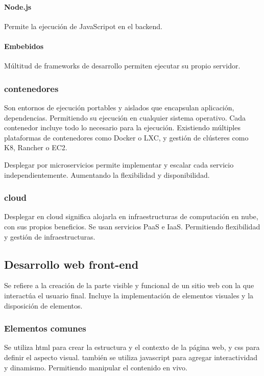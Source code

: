         \paragraph{Node.js}
            Permite la ejecución de JavaScripot en el backend.

        \paragraph{Embebidos}
            Múltitud de frameworks de desarrollo permiten ejecutar su propio servidor.

    \subsubsection{contenedores}
        Son entornos de ejecución portables y aislados que encapsulan aplicación, dependencias. Permitiendo su ejecución en cualquier sistema operativo. Cada contenedor incluye todo lo necesario para la ejecución. Existiendo múltiples plataformas de contenedores como Docker o LXC, y gestión de clústeres como K8, Rancher o EC2.

        Desplegar por microservicios permite implementar y escalar cada servicio independientemente. Aumentando la flexibilidad y disponibilidad.

    \subsubsection{cloud}
        Desplegar en cloud significa alojarla en infraestructuras de computación en nube, con sus propios beneficios. Se usan servicios PaaS e IaaS. Permitiendo flexibilidad y gestión de infraestructuras.

\subsection{Desarrollo web front-end}

    Se refiere a la creación de la parte visible y funcional de un sitio web con la que interactúa el usuario final. Incluye la implementación de elementos visuales y la disposición de elementos.

    \subsubsection{Elementos comunes}
        Se utiliza html para crear la estructura y el contexto de la página web, y css para definir el aspecto visual. también se utiliza javascript para agregar interactividad y dinamismo. Permitiendo manipular el contenido en vivo.

